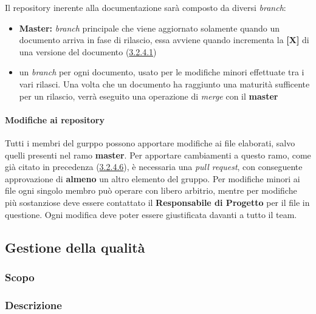 Il repository inerente alla documentazione sarà composto da diversi \textit{branch}:
\begin{itemize}

	\item \textbf{Master:} \textit{branch} principale che viene aggiornato solamente quando un documento arriva in fase di rilascio, essa avviene quando incrementa la \textbf{[X]} di una versione del documento (\hyperref[cod-versionamento]{3.2.4.1})
	
	\item un \textit{branch} per ogni documento, usato per le modifiche minori effettuate tra i vari rilasci. Una volta che un documento ha raggiunto una maturità sufficente per un rilascio, verrà eseguito una operazione di \textit{merge} con il \textbf{master}

\end{itemize}

\paragraph{Modifiche ai repository}

Tutti i membri del gurppo possono apportare modifiche ai file elaborati, salvo quelli presenti nel ramo \textbf{master}. Per apportare cambiamenti a questo ramo, come già citato in precedenza (\hyperref[NormeBranching]{3.2.4.6}), è necessaria una \textit{pull request}, con conseguente approvazione di \textbf{almeno} un altro elemento del gruppo.\newline
Per modifiche minori ai file ogni singolo membro può operare con libero arbitrio, mentre per modifiche più sostanziose deve essere contattato il \textbf{Responsabile di Progetto} per il file in questione.\newline
Ogni modifica deve poter essere giustificata davanti a tutto il team.

\subsection{Gestione della qualità}

\subsubsection{Scopo}

\subsubsection{Descrizione}

